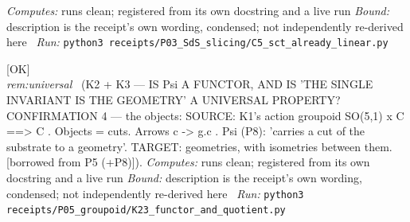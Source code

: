 \begin{description}
\emph{Computes:} runs clean; registered from its own docstring and a live run
 \emph{Bound:} description is the receipt's own wording, condensed; not independently re-derived here
\ \emph{Run:} \texttt{python3 receipts/P03\_SdS\_slicing/C5\_sct\_already\_linear.py}
\item[\rcptlabel{K23_functor_and_quotient}{P5R8}\textbf{P5R8}\quad\texttt{K23\_functor\_and\_quotient}]\hfill\textsf{[OK]}\\
\textit{rem:universal} \ (K2 + K3 --- IS Psi A FUNCTOR, AND IS 'THE SINGLE INVARIANT IS THE GEOMETRY' A UNIVERSAL PROPERTY? CONFIRMATION 4 --- the objects: SOURCE: K1's action groupoid SO(5,1) \textbar{}x C ==> C . Objects = cuts. Arrows c -> g.c . Psi (P8): 'carries a cut of the substrate to a geometry'. TARGET: geometries, with isometries between them. [borrowed from P5 (+P8)]). 
\emph{Computes:} runs clean; registered from its own docstring and a live run
 \emph{Bound:} description is the receipt's own wording, condensed; not independently re-derived here
\ \emph{Run:} \texttt{python3 receipts/P05\_groupoid/K23\_functor\_and\_quotient.py}
\end{description}\endgroup
